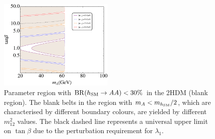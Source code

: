\documentclass[preprintnumbers,superscriptaddress,nofootinbib,aps,prd,floatfix]{revtex4}
\newcommand{\BR} {\ensuremath{\mathrm{BR}}}
\begin{document}
\begin{figure}[htbp]
\begin{center}
\includegraphics[width=0.5\textwidth,natwidth=610,natheight=642]{Figures/fig6.pdf} 
\caption{Parameter region with $\BR(h_{\rm SM}\to AA)<30\%$ in the 2HDM (blank region). The blank belts in the region with $m_A < m_{h_{\rm SM}}/2$, which are characterised by different boundary colours, are yielded by different $m_{12}^2$ values. The black dashed line represents a universal upper limit on $\tan\beta$ due to the perturbation requirement for $\lambda_1$.}
\label{fig:Brhaa_2HDM} 
\end{center}
\end{figure}
\end{document}
